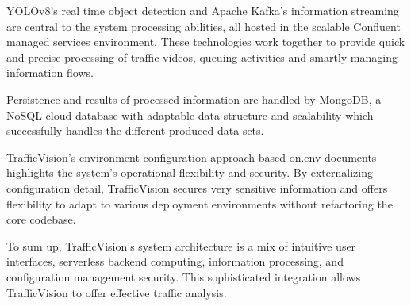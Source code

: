YOLOv8's real time object detection and Apache Kafka's information streaming are central to the system processing abilities, all hosted in the scalable Confluent managed services environment. These technologies work together to provide quick and precise processing of traffic videos, queuing activities and smartly managing information flows.

Persistence and results of processed information are handled by MongoDB, a NoSQL cloud database with adaptable data structure and scalability which successfully handles the different produced data sets.

TrafficVision's environment configuration approach based on.env documents highlights the system's operational flexibility and security. By externalizing configuration detail, TrafficVision secures very sensitive information and offers flexibility to adapt to various deployment environments without refactoring the core codebase.

To sum up, TrafficVision's system architecture is a mix of intuitive user interfaces, serverless backend computing, information processing, and configuration management security. This sophisticated integration allows TrafficVision to offer effective traffic analysis.